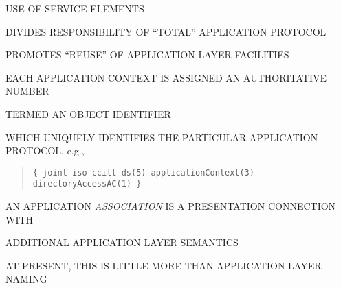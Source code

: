 \begin{bwslide}

\begin{nrtc}
\item	USE OF SERVICE ELEMENTS
    \begin{nrtc}
    \item	DIVIDES RESPONSIBILITY OF ``TOTAL'' APPLICATION PROTOCOL

    \item	PROMOTES ``REUSE'' OF APPLICATION LAYER FACILITIES
    \end{nrtc}

\item	EACH APPLICATION CONTEXT IS ASSIGNED AN AUTHORITATIVE NUMBER
    \begin{nrtc}
    \item	TERMED AN OBJECT IDENTIFIER
    \end{nrtc}
    WHICH UNIQUELY IDENTIFIES THE PARTICULAR APPLICATION PROTOCOL, e.g.,
\begin{quote}\smaller\begin{verbatim}
{ joint-iso-ccitt ds(5) applicationContext(3) directoryAccessAC(1) }
\end{verbatim}\end{quote}
\end{nrtc}
\end{bwslide}




\begin{bwslide}

\begin{nrtc}
\item	AN APPLICATION \emph{ASSOCIATION} IS A PRESENTATION CONNECTION WITH
    \begin{nrtc}
    \item	ADDITIONAL APPLICATION LAYER SEMANTICS
    \end{nrtc}

\item	AT PRESENT, THIS IS LITTLE MORE THAN APPLICATION LAYER NAMING
\end{nrtc}
\end{bwslide}


